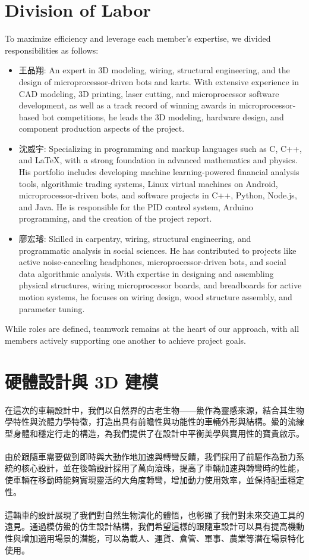\documentclass[a4paper,12pt]{article}
\begin{document}
\section{Division of Labor}
To maximize efficiency and leverage each member's expertise, we divided responsibilities as follows:
\begin{itemize}
\item 王品翔: An expert in 3D modeling, wiring, structural engineering, and the design of microprocessor-driven bots and karts. With extensive experience in CAD modeling, 3D printing, laser cutting, and microprocessor software development, as well as a track record of winning awards in microprocessor-based bot competitions, he leads the 3D modeling, hardware design, and component production aspects of the project.
\item 沈威宇: Specializing in programming and markup languages such as C, C++, and LaTeX, with a strong foundation in advanced mathematics and physics. His portfolio includes developing machine learning-powered financial analysis tools, algorithmic trading systems, Linux virtual machines on Android, microprocessor-driven bots, and software projects in C++, Python, Node.js, and Java. He is responsible for the PID control system, Arduino programming, and the creation of the project report.
\item 廖宏璿: Skilled in carpentry, wiring, structural engineering, and programmatic analysis in social sciences. He has contributed to projects like active noise-canceling headphones, microprocessor-driven bots, and social data algorithmic analysis. With expertise in designing and assembling physical structures, wiring microprocessor boards, and breadboards for active motion systems, he focuses on wiring design, wood structure assembly, and parameter tuning.
\end{itemize}
While roles are defined, teamwork remains at the heart of our approach, with all members actively supporting one another to achieve project goals.

\section{硬體設計與 3D 建模}
在這次的車輛設計中，我們以自然界的古老生物——鱟作為靈感來源，結合其生物學特性與流體力學特徵，打造出具有前瞻性與功能性的車輛外形與結構。鱟的流線型身體和穩定行走的構造，為我們提供了在設計中平衡美學與實用性的寶貴啟示。\\\\
由於跟隨車需要做到即時與大動作地加速與轉彎反饋，我們採用了前驅作為動力系統的核心設計，並在後輪設計採用了萬向滾珠，提高了車輛加速與轉彎時的性能，使車輛在移動時能夠實現靈活的大角度轉彎，增加動力使用效率，並保持配重穩定性。\\\\
這輛車的設計展現了我們對自然生物演化的體悟，也彰顯了我們對未來交通工具的遠見。通過模仿鱟的仿生設計結構，我們希望這樣的跟隨車設計可以具有提高機動性與增加適用場景的潛能，可以為載人、運貨、倉管、軍事、農業等潛在場景特化使用。
\end{document}
